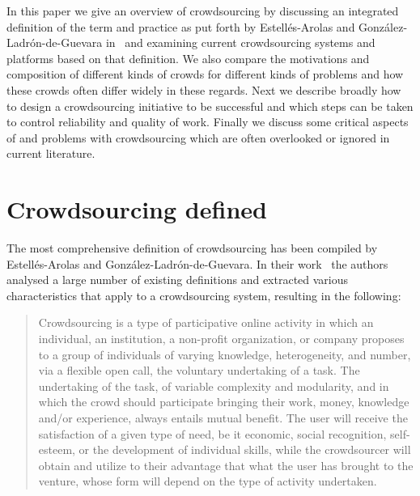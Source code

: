 \documentclass{sig-alternate}
\begin{document}
In this paper we give an overview of crowdsourcing by discussing an integrated
definition of the term and practice as put forth by Estell{\'e}s-Arolas and
Gonz{\'a}lez-Ladr{\'o}n-de-Guevara in~\cite{estelles2012towards} and examining
current crowdsourcing systems and platforms based on that definition. We also
compare the motivations and composition of different kinds of crowds for
different kinds of problems and how these crowds often differ widely in these
regards. Next we describe broadly how to design a crowdsourcing initiative to be
successful and which steps can be taken to control reliability and quality of
work. Finally we discuss some critical aspects of and problems with
crowdsourcing which are often overlooked or ignored in current literature. 


\section{Crowdsourcing defined}

The most comprehensive definition of crowdsourcing has been compiled by
Estell{\'e}s-Arolas and Gonz{\'a}lez-Ladr{\'o}n-de-Guevara. In their
work~\cite{estelles2012towards} the authors analysed a large number of
existing definitions and extracted various characteristics that apply to a
crowdsourcing system, resulting in the following: 
\begin{quotation}
	Crowdsourcing is a type of participative online activity in which an
	individual, an institution, a non-profit organization, or company proposes to
	a group of individuals of varying knowledge, heterogeneity, and number, via a
	flexible open call, the voluntary undertaking of a task. The undertaking of
	the task, of variable complexity and modularity, and in which the crowd should
	participate bringing their work, money, knowledge and/or experience, always
	entails mutual benefit. The user will receive the satisfaction of a given type
	of need, be it economic, social recognition, self-esteem, or the development
	of individual skills, while the crowdsourcer will obtain and utilize to their
	advantage that what the user has brought to the venture, whose form will
	depend on the type of activity undertaken.
\end{quotation}
\end{document}
